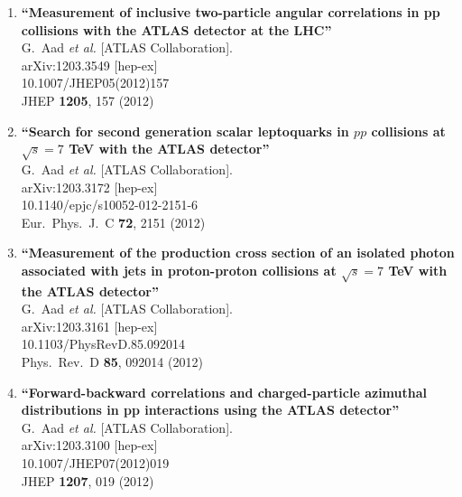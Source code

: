 \documentclass{article}
\begin{document}
\begin{enumerate}
\item%
{\bf ``Measurement of inclusive two-particle angular correlations in pp collisions with the ATLAS detector at the LHC''}
  \\{}G.~Aad {\it et al.}  [ATLAS Collaboration].
  \\{}arXiv:1203.3549 [hep-ex]
    \\{}10.1007/JHEP05(2012)157
\\{}JHEP {\bf 1205}, 157 (2012) %


\item%
{\bf ``Search for second generation scalar leptoquarks in $pp$ collisions at $\sqrt{s}=7$ TeV with the ATLAS detector''}
  \\{}G.~Aad {\it et al.}  [ATLAS Collaboration].
  \\{}arXiv:1203.3172 [hep-ex]
    \\{}10.1140/epjc/s10052-012-2151-6
\\{}Eur.\ Phys.\ J.\ C {\bf 72}, 2151 (2012) %


\item%
{\bf ``Measurement of the production cross section of an isolated photon associated with jets in proton-proton collisions at $\sqrt{s}=7$ TeV with the ATLAS detector''}
  \\{}G.~Aad {\it et al.}  [ATLAS Collaboration].
  \\{}arXiv:1203.3161 [hep-ex]
    \\{}10.1103/PhysRevD.85.092014
\\{}Phys.\ Rev.\ D {\bf 85}, 092014 (2012) %


\item%
{\bf ``Forward-backward correlations and charged-particle azimuthal distributions in pp interactions using the ATLAS detector''}
  \\{}G.~Aad {\it et al.}  [ATLAS Collaboration].
  \\{}arXiv:1203.3100 [hep-ex]
    \\{}10.1007/JHEP07(2012)019
\\{}JHEP {\bf 1207}, 019 (2012) %



\end{enumerate}
\end{document}
